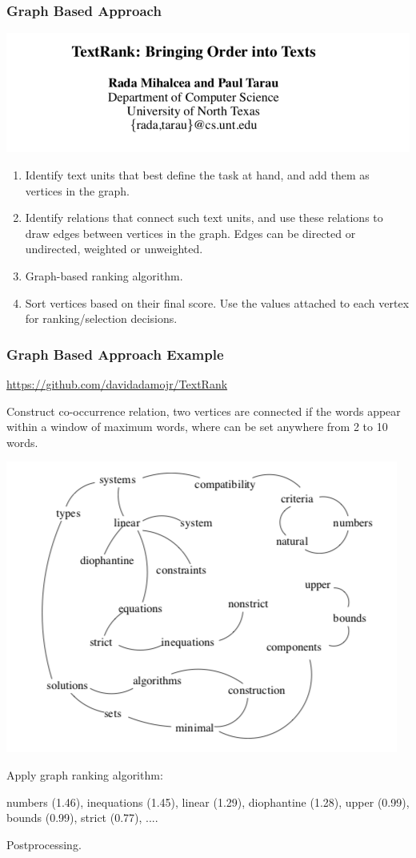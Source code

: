 \documentclass{beamer}
\begin{document}
\begin{frame}
\frametitle{Graph Based Approach}
\includegraphics[width= \textwidth]{img/textrank}

\begin{enumerate}
\item Identify text units that best define the task at hand, and add them as vertices in the graph.
\item Identify relations that connect such text units, and use these relations to draw edges between vertices in the graph. Edges can be directed or undirected, weighted or unweighted.
\item Graph-based ranking algorithm.
\item Sort vertices based on their final score. Use the values attached to each vertex for ranking/selection decisions.
\end{enumerate}
\end{frame}

\begin{frame}
\frametitle{Graph Based Approach Example}

\url{https://github.com/davidadamojr/TextRank}

\vspace{0.1in}

Construct co-occurrence relation, two vertices are connected if the words appear within a window of maximum words, where can be set anywhere from 2 to 10 words.
\begin{center}
\includegraphics[scale = 0.3]{img/graph}
\end{center}
Apply graph ranking algorithm:

numbers (1.46), inequations (1.45), linear (1.29), diophantine (1.28), upper (0.99), bounds (0.99), strict (0.77), ....

\vspace{0.1in}
Postprocessing.
\end{frame}
\end{document}
